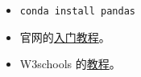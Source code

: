 
\begin{issues}
\issueDraft
\end{issues}

\begin{itemize}
\item \verb|conda install pandas|
\item 官网的\href{https://pandas.pydata.org/docs/getting_started/index.html}{入门教程}。
\item W3schools 的\href{https://www.w3schools.com/python/pandas/default.asp}{教程}。
\end{itemize}
